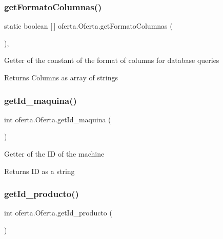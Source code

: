 \subsubsection{\texorpdfstring{get\+Formato\+Columnas()}{getFormatoColumnas()}}
{\footnotesize\ttfamily static boolean \mbox{[}$\,$\mbox{]} oferta.\+Oferta.\+get\+Formato\+Columnas (\begin{DoxyParamCaption}{ }\end{DoxyParamCaption})\hspace{0.3cm}{\ttfamily [inline]}, {\ttfamily [static]}}

Getter of the constant of the format of columns for database queries

\begin{DoxyReturn}{Returns}
Columns as array of strings 
\end{DoxyReturn}
\mbox{\label{classoferta_1_1_oferta_a1da8cf2d56690b843a8361c637352a23}} 
\subsubsection{\texorpdfstring{get\+Id\+\_\+maquina()}{getId\_maquina()}}
{\footnotesize\ttfamily int oferta.\+Oferta.\+get\+Id\+\_\+maquina (\begin{DoxyParamCaption}{ }\end{DoxyParamCaption})\hspace{0.3cm}{\ttfamily [inline]}}

Getter of the ID of the machine

\begin{DoxyReturn}{Returns}
ID as a string 
\end{DoxyReturn}
\mbox{\label{classoferta_1_1_oferta_a61489be4622a79a222570257a4921243}} 
\subsubsection{\texorpdfstring{get\+Id\+\_\+producto()}{getId\_producto()}}
{\footnotesize\ttfamily int oferta.\+Oferta.\+get\+Id\+\_\+producto (\begin{DoxyParamCaption}{ }\end{DoxyParamCaption})\hspace{0.3cm}{\ttfamily [inline]}}

